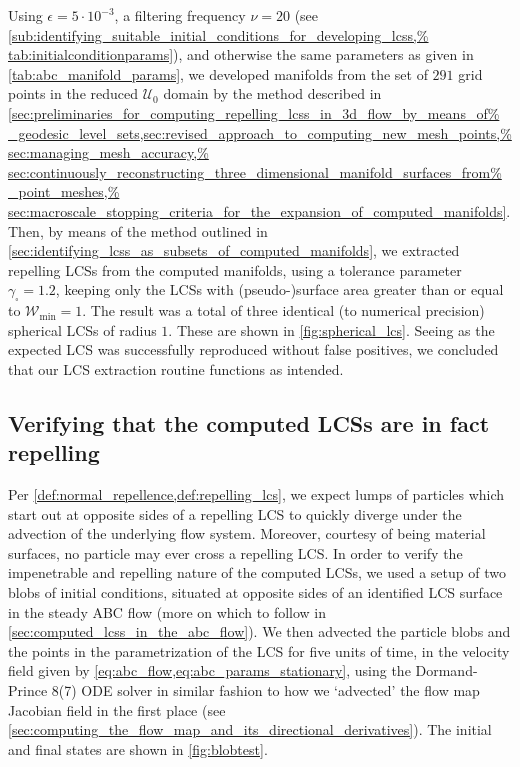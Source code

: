 Using $\epsilon=5\cdot10^{-3}$, a filtering frequency $\nu=20$ (see
\cref{sub:identifying_suitable_initial_conditions_for_developing_lcss,%
tab:initialconditionparams}), and otherwise the same parameters as given
in \cref{tab:abc_manifold_params}, we developed manifolds from the set
of $291$ grid points in the reduced $\mathcal{U}_{0}$ domain by the method
described in
\cref{sec:preliminaries_for_computing_repelling_lcss_in_3d_flow_by_means_of%
    _geodesic_level_sets,sec:revised_approach_to_computing_new_mesh_points,%
    sec:managing_mesh_accuracy,%
    sec:continuously_reconstructing_three_dimensional_manifold_surfaces_from%
    _point_meshes,%
    sec:macroscale_stopping_criteria_for_the_expansion_of_computed_manifolds}.
Then, by means of the method outlined in
\cref{sec:identifying_lcss_as_subsets_of_computed_manifolds}, we extracted
repelling LCSs from the computed manifolds, using a tolerance parameter
$\gamma_{\square}=1.2$, keeping only the LCSs with (pseudo-)surface area
greater than or equal to $\mathcal{W}_{\min}=1$. The result was a total of
three identical (to numerical precision) spherical LCSs of radius $1$. These
are shown in \cref{fig:spherical_lcs}. Seeing as the expected LCS was
successfully reproduced without false positives, we concluded that our LCS
extraction routine functions as intended.




\subsection{Verifying that the computed LCSs are in fact repelling}
\label{sub:verifying_that_the_computed_lcss_are_in_fact_repelling}

Per \cref{def:normal_repellence,def:repelling_lcs}, we expect lumps of
particles which start out at opposite sides of a repelling LCS to quickly
diverge under the advection of the underlying flow system. Moreover, courtesy
of being material surfaces, no particle may ever cross a repelling LCS. In
order to verify the impenetrable and repelling nature of the computed LCSs, we
used a setup of two blobs of initial conditions, situated at opposite sides of
an identified LCS surface in the steady ABC flow (more on which to follow in
\cref{sec:computed_lcss_in_the_abc_flow}). We then advected the particle blobs
and the points in the parametrization of the LCS for five units of time,
in the velocity field given by \cref{eq:abc_flow,eq:abc_params_stationary},
using the Dormand-Prince 8(7) ODE solver in similar fashion to how we
`advected' the flow map Jacobian field in the first place
(see \cref{sec:computing_the_flow_map_and_its_directional_derivatives}).
The initial and final states are shown in \cref{fig:blobtest}.

